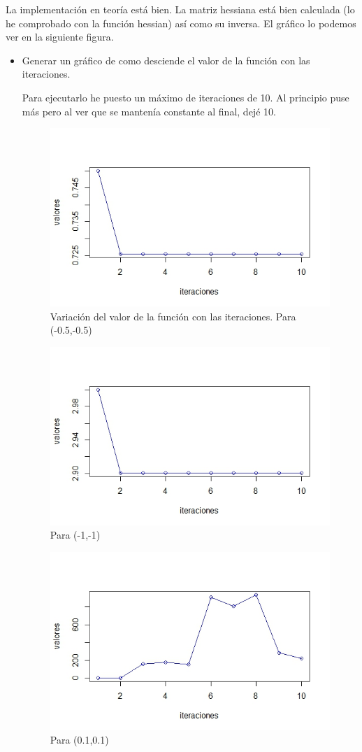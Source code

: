 	 La implementación en teoría está bien. La matriz hessiana está bien calculada (lo he comprobado con la función hessian) así como su inversa. El gráfico lo podemos ver en la siguiente figura.
	 \begin{itemize}
	 	\item Generar un gráfico de como desciende el valor de la función con las iteraciones.
	 	
	 	Para ejecutarlo he puesto un máximo de iteraciones de 10. Al principio puse más pero al ver que se mantenía constante al final, dejé 10.
	 	
	 	\begin{figure} [H]
		\centering
		\includegraphics[width=0.7\linewidth]{captura5}
		\caption{Variación del valor de la función con las iteraciones. Para (-0.5,-0.5)}
		\label{fig:captura5}
		\end{figure}
		
		\begin{figure} [H]
		\centering
		\includegraphics[width=0.7\linewidth]{captura6}
		\caption{Para (-1,-1)}
		\label{fig:captura6}
		\end{figure}
		
		\begin{figure} [H]
		\centering
		\includegraphics[width=0.7\linewidth]{captura7}
		\caption{Para (0.1,0.1)}
		\label{fig:captura7}
		\end{figure}
		

\end{itemize}
